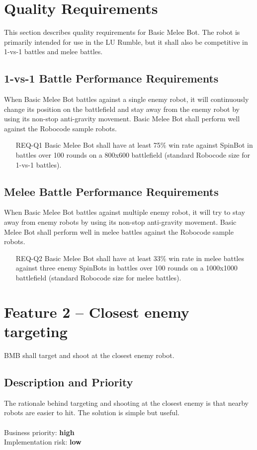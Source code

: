 \documentclass{scrreprt}
\begin{document}
\section{Quality Requirements}
This section describes quality requirements for Basic Melee Bot. The robot is primarily intended for use in the LU Rumble, but it shall also be competitive in 1-vs-1 battles and melee battles.

\subsection{1-vs-1 Battle Performance Requirements}
When Basic Melee Bot battles against a single enemy robot, it will continuously change its position on the battlefield and stay away from the enemy robot by using its non-stop anti-gravity movement. Basic Melee Bot shall perform well against the Robocode sample robots.

\begin{itemize}
\item[REQ-Q1] Basic Melee Bot shall have at least 75\% win rate against SpinBot in battles over 100 rounds on a 800x600 battlefield (standard Robocode size for 1-vs-1 battles).
\end{itemize}

\subsection{Melee Battle Performance Requirements}
When Basic Melee Bot battles against multiple enemy robot, it will try to stay away from enemy robots by using its non-stop anti-gravity movement. Basic Melee Bot shall perform well in melee battles against the Robocode sample robots.

\begin{itemize}
\item[REQ-Q2] Basic Melee Bot shall have at least 33\% win rate in melee battles against three enemy SpinBots in battles over 100 rounds on a 1000x1000 battlefield (standard Robocode size for melee battles).
\end{itemize}

\section{Feature 2 -- Closest enemy targeting}
BMB shall target and shoot at the closest enemy robot.

\subsection{Description and Priority}
The rationale behind targeting and shooting at the closest enemy is that nearby robots are easier to hit. The solution is simple but useful.\\\\Business priority: \textbf{high}\\
Implementation risk: \textbf{low}
\end{document}
